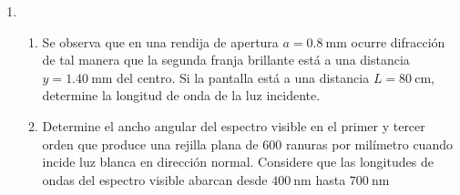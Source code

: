 \documentclass[letterpaper,11pt]{article}
\begin{document}
\begin{enumerate}
\item 
\begin{enumerate}
    \item Se observa que en una rendija de apertura $a=\SI{0.8}{\mm}$ ocurre difracción de tal manera que la segunda franja brillante está a una distancia $y=\SI{1.40}{\mm}$ del centro. Si la pantalla está a una distancia $L=\SI{80}{\cm}$, determine la longitud de onda de la luz incidente.

    \item Determine el ancho angular del espectro visible en el primer y tercer orden  que produce una rejilla plana de $600$ ranuras por milímetro cuando incide luz blanca en dirección normal. Considere que las longitudes de ondas del espectro visible abarcan desde $\SI{400}{\nm}$ hasta $\SI{700}{\nm}$
\end{enumerate}

\end{enumerate}
\end{document}
